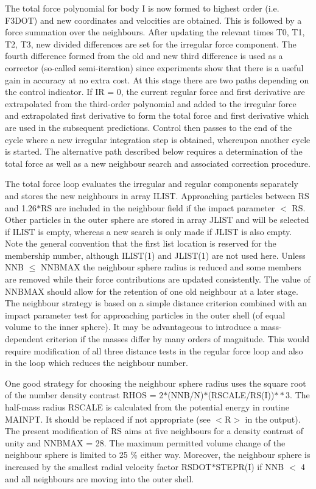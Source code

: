  The total force polynomial for body I is now formed to highest order
 (i.e. F3DOT) and new coordinates and velocities are obtained.  This is followed
 by a force summation over the neighbours.  After updating the relevant times
 T0, T1, T2, T3, new divided differences are set for the
 irregular force component.  The fourth difference formed from the old and new
 third difference is used as a corrector (so-called semi-iteration) since
 experiments show that there is a useful gain in accuracy at no extra cost.  At
    this stage there are two paths depending on the control indicator.  If
 IR = 0, the current regular force and first derivative are extrapolated from
 the third-order polynomial and added to the irregular force and extrapolated
 first derivative to form the total force and first derivative which are
 used in the subsequent predictions.  Control then
              passes to the end of the cycle where a new irregular integration
 step is obtained, whereupon another cycle is started.  The alternative path
 described below requires a determination of the total force as well as a
 new neighbour search and associated correction procedure.

 The total force loop evaluates the irregular and regular components
 separately and stores the new neighbours in array ILIST.  Approaching
 particles between RS and 1.26$\ast$RS are included in the neighbour field if
 the
 impact parameter $<$ RS.  Other particles in the outer sphere are
 stored in array JLIST and will be selected if ILIST is empty, whereas a new
 search is only made if JLIST is also empty.  Note the general convention that
 the first list location is reserved for the membership number, although
 ILIST(1) and JLIST(1) are not used here.  Unless
 NNB $\leq$ NNBMAX the neighbour sphere radius is reduced and some members are
 removed while their force contributions are updated consistently.  The
 value of NNBMAX should allow for the retention of one old neighbour at
 a later stage.  The neighbour strategy is based on a simple distance criterion
 combined with an impact parameter test for approaching particles in the outer
 shell (of equal volume to the inner sphere).  It may
 be advantageous to introduce a mass-dependent criterion if the
 masses differ by many orders of magnitude.  This would require modification of
 all three distance tests in the regular force loop and also in the loop which
 reduces the neighbour number.

 One good strategy for choosing the neighbour sphere radius uses the
 square root of the number density contrast
 RHOS = 2$\ast$(NNB/N)$\ast$(RSCALE/RS(I))$\ast\ast$3.  The half-mass radius
 RSCALE is
 calculated from the potential energy
 in routine MAINPT.  It should be replaced if not appropriate (see $<$R$>$
 in the output).  The present modification
 of RS aims at five neighbours for a density contrast of unity and
 NNBMAX = 28.  The maximum permitted volume change of the neighbour
 sphere is limited to 25 \% either way.  Moreover,
 the neighbour sphere is increased by the smallest radial
 velocity factor RSDOT$\ast$STEPR(I) if NNB $<$ 4 and all neighbours are moving
 into the outer shell.

